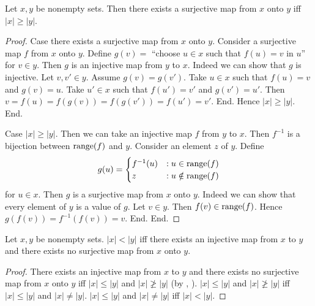 \documentclass[10pt]{article}
\begin{document}
  \begin{forthel}
    \begin{proposition}
      Let $x, y$ be nonempty sets.
      Then there exists a surjective map from $x$ onto $y$ iff $|x| \geq |y|$.
    \end{proposition}
    \begin{proof}
      Case there exists a surjective map from $x$ onto $y$.
        Consider a surjective map $f$ from $x$ onto $y$.
        Define $g(v) =$ ``choose $u \in x$ such that $f(u) = v$ in $u$'' for $v \in y$.
        Then $g$ is an injective map from $y$ to $x$.
        Indeed we can show that $g$ is injective.
          Let $v, v' \in y$.
          Assume $g(v) = g(v')$.
          Take $u \in x$ such that $f(u) = v$ and $g(v) = u$.
          Take $u' \in x$ such that $f(u') = v'$ and $g(v') = u'$.
          Then $v
            = f(u)
            = f(g(v))
            = f(g(v'))
            = f(u')
            = v'$.
        End.
        Hence $|x| \geq |y|$.
      End.

      Case $|x| \geq |y|$.
        Then we can take an injective map $f$ from $y$ to $x$.
        Then $f^{-1}$ is a bijection between $\textrm{range}(f)$ and $y$.
        Consider an element $z$ of $y$.
        Define \[ g(u) =
          \begin{cases}
            f^{-1}(u) & : u \in \textrm{range}(f) \\
            z         & : u \notin \textrm{range}(f)
          \end{cases} \]
        for $u \in x$.
        Then $g$ is a surjective map from $x$ onto $y$.
        Indeed we can show that every element of $y$ is a value of $g$.
          Let $v \in y$.
          Then $f(v) \in \textrm{range}(f)$.
          Hence $g(f(v)) = f^{-1}(f(v)) = v$.
        End.
      End.
    \end{proof}
  \end{forthel}

  \begin{forthel}
    \begin{proposition}
      Let $x, y$ be nonempty sets.
      $|x| < |y|$ iff there exists an injective map from $x$ to $y$ and there exists no surjective map from $x$ onto $y$.
    \end{proposition}
    \begin{proof}
      There exists an injective map from $x$ to $y$ and there exists no surjective map from $x$ onto $y$ iff $|x| \leq |y|$ and $|x| \ngeq |y|$ (by , ).
      $|x| \leq |y|$ and $|x| \ngeq |y|$ iff $|x| \leq |y|$ and $|x| \neq |y|$.
      $|x| \leq |y|$ and $|x| \neq |y|$ iff $|x| < |y|$.
    \end{proof}
  \end{forthel}
\end{document}
